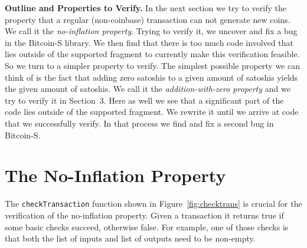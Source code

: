 \documentclass[hyphens, a4paper,USenglish,cleveref, autoref, thm-restate]{oasics-v2019}
\renewcommand{\paragraph}{\textbf}%
\begin{document}
\paragraph{Outline and Properties to Verify.} In the next section we
try to verify the property that a regular (non-coinbase) transaction
can not generate new coins. We call it the \emph{no-inflation
  property}. Trying to verify it, we uncover and fix a bug in the
Bitcoin-S library. We then find that there is too much code involved
that lies outside of the supported fragment to currently make this
verification feasible. So we turn to a simpler property to verify. The
simplest possible property we can think of is the fact that adding
zero satoshis to a given amount of satoshis yields the given amount of
satoshis. We call it the \emph{addition-with-zero property} and we try
to verify it in Section~3. Here as well we see that a significant part
of the code lies outside of the supported fragment. We rewrite it
until we arrive at code that we successfully verify. In that process
we find and fix a second bug in Bitcoin-S.


\section{The No-Inflation Property}


The \texttt{checkTransaction} function shown in
Figure~\ref{fig:checktrans} is crucial for the verification of the
no-inflation property. Given a transaction it returns true if some
basic checks succeed, otherwise false. For example, one of those
checks is that both the list of inputs and list of outputs need to be
non-empty.
\end{document}
